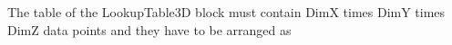 %
%
%
%
%
%
%
%
The table of the LookupTable3D block must contain DimX times DimY times DimZ data points and they have to be arranged as

